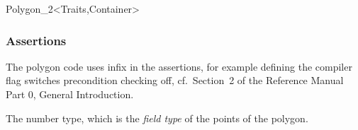 \begin{ccClassTemplate}{Polygon_2<Traits,Container>}
\subsubsection*{Assertions}
The polygon code uses infix  in the assertions,
for example defining the compiler flag
 switches precondition
checking off, cf.~Section~2 of the Reference Manual Part 0, General 
Introduction.








\ccThreeToTwo
{}
\ccGlue
{}

{The number type, which is the {\em field type} of the points of the polygon.} 
\ccGlue
{}
\ccGlue
{}


\end{ccClassTemplate}
